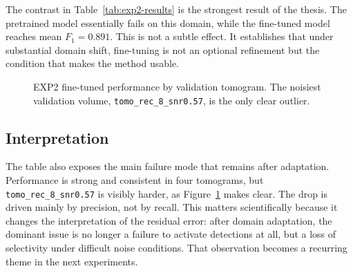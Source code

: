 \documentclass[12pt,a4paper]{report}
\begin{document}
The contrast in Table~\ref{tab:exp2-results} is the strongest result of the thesis. The pretrained model essentially fails on this domain, while the fine-tuned model reaches mean \(F_1=0.891\). This is not a subtle effect. It establishes that under substantial domain shift, fine-tuning is not an optional refinement but the condition that makes the method usable.

\begin{figure}[H]
  \centering
  \caption{EXP2 fine-tuned performance by validation tomogram. The noisiest validation volume, \texttt{tomo\_rec\_8\_snr0.57}, is the only clear outlier.}
  \label{fig:exp2-by-tomogram}
\end{figure}

\subsection{Interpretation}
The table also exposes the main failure mode that remains after adaptation. Performance is strong and consistent in four tomograms, but \texttt{tomo\_rec\_8\_snr0.57} is visibly harder, as Figure~\ref{fig:exp2-by-tomogram} makes clear. The drop is driven mainly by precision, not by recall. This matters scientifically because it changes the interpretation of the residual error: after domain adaptation, the dominant issue is no longer a failure to activate detections at all, but a loss of selectivity under difficult noise conditions. That observation becomes a recurring theme in the next experiments.
\end{document}
